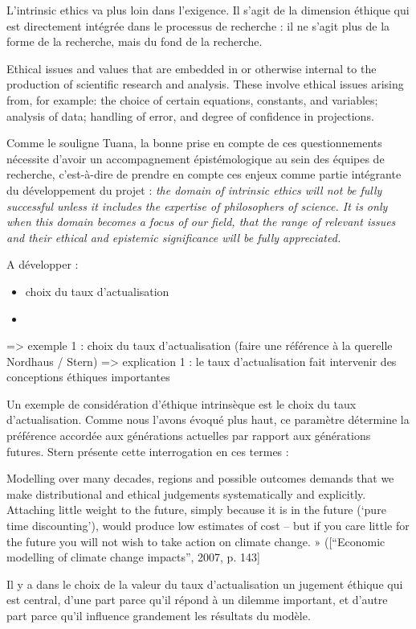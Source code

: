 L'\Gls{intrinsic ethics} va plus loin dans l'exigence. Il s'agit de la dimension éthique qui est directement intégrée dans le processus de recherche : il ne s'agit plus de la forme de la recherche, mais du fond de la recherche. 

\begin{displayquote}
Ethical issues and values that are embedded in or otherwise internal to the production of scientific research and analysis. These involve ethical issues arising from, for example: the choice of certain equations, constants, and variables; analysis of data; handling of error, and degree of confidence in projections.
\end{displayquote}
Comme le souligne Tuana, la bonne prise en compte de ces questionnements nécessite d'avoir un accompagnement épistémologique au sein des équipes de recherche, c'est-à-dire de prendre en compte ces enjeux comme partie intégrante du développement du projet : \emph{the domain of intrinsic ethics will not be fully successful unless it includes the expertise of philosophers of science. It is only when this domain becomes a focus of our field, that the range of relevant issues and their ethical and epistemic significance will be fully appreciated.} 

\begin{tcolorbox}
    A développer : 
    \begin{itemize}
        \item choix du taux d'actualisation
        \item 
    \end{itemize}
\end{tcolorbox}

=> exemple 1 : choix du taux d'actualisation (faire une référence à la querelle Nordhaus / Stern)
=> explication 1 : le taux d'actualisation fait intervenir des conceptions éthiques importantes

Un exemple de considération d'éthique intrinsèque est le choix du taux d'actualisation. Comme nous l'avons évoqué plus haut, ce paramètre détermine la préférence accordée aux générations actuelles par rapport aux générations futures. Stern présente cette interrogation en ces termes : 

\begin{displayquote}
Modelling over many decades, regions and possible outcomes demands that we make distributional and ethical judgements systematically and explicitly. Attaching little weight to the future, simply because it is in the future (‘pure time discounting’), would produce low estimates of cost – but if you care little for the future you will not wish to take action on climate change. » ([“Economic modelling of climate change impacts”, 2007, p. 143]
\end{displayquote}
Il y a dans le choix de la valeur du taux d'actualisation un jugement éthique qui est central, d'une part parce qu'il répond à un dilemme important, et d'autre part parce qu'il influence grandement les résultats du modèle. 

